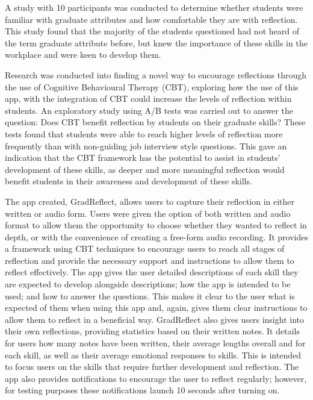\documentclass{l4proj}
\begin{document}
A study with 10 participants was conducted to determine whether students were familiar with graduate attributes and how comfortable they are with reflection. This study found that the majority of the students questioned had not heard of the term graduate attribute before, but knew the importance of these skills in the workplace and were keen to develop them.

Research was conducted into finding a novel way to encourage reflections through the use of Cognitive Behavioural Therapy (CBT), exploring how the use of this app, with the integration of CBT could increase the levels of reflection within students. An exploratory study using A/B tests was carried out to answer the question: Does CBT benefit reflection by students on their graduate skills? These tests found that students were able to reach higher levels of reflection more frequently than with non-guiding job interview style questions. This gave an indication that the CBT framework has the potential to assist in students’ development of these skills, as deeper and more meaningful reflection would benefit students in their awareness and development of these skills.

The app created, GradReflect, allows users to capture their reflection in either written or audio form. Users were given the option of both written and audio format to allow them the opportunity to choose whether they wanted to reflect in depth, or with the convenience of creating a free-form audio recording. It provides a framework using CBT techniques to encourage users to reach all stages of reflection and provide the necessary support and instructions to allow them to reflect effectively. The app gives the user detailed descriptions of each skill they are expected to develop alongside descriptions; how the app is intended to be used; and how to answer the questions. This makes it clear to the user what is expected of them when using this app and, again, gives them clear instructions to allow them to reflect in a beneficial way. GradReflect also gives users insight into their own reflections, providing statistics based on their written notes. It details for users how many notes have been written, their average lengths overall and for each skill, as well as their average emotional responses to skills. This is intended to focus users on the skills that require further development and reflection. The app also provides notifications to encourage the user to reflect regularly; however, for testing purposes these notifications launch 10 seconds after turning on.
\end{document}
